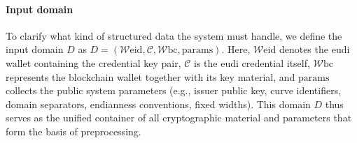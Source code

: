 \paragraph{Input domain}
To clarify what kind of structured data the system must handle, we define the input domain $D$ as $D = (\mathcal{W}{\mathrm{eid}}, \mathcal{C}, \mathcal{W}{\mathrm{bc}}, \mathrm{params})$. Here, $\mathcal{W}{\mathrm{eid}}$ denotes the \acrshort{eudi} wallet containing the credential key pair, $\mathcal{C}$ is the \acrshort{eudi} credential itself, $\mathcal{W}{\mathrm{bc}}$ represents the blockchain wallet together with its key material, and $\mathrm{params}$ collects the public system parameters (e.g., issuer public key, curve identifiers, domain separators, endianness conventions, fixed widths). This domain $D$ thus serves as the unified container of all cryptographic material and parameters that form the basis of preprocessing.

